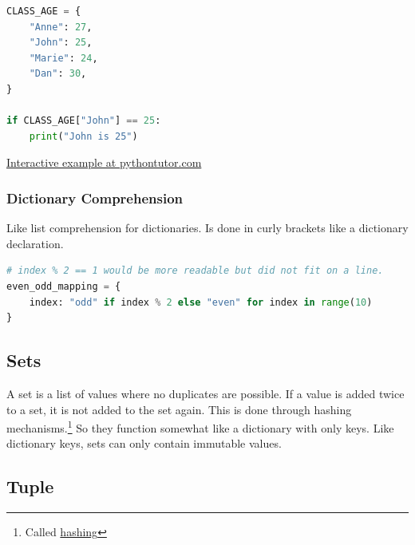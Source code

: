 \documentclass{article}
\begin{document}
\begin{lstlisting}[language=Python]
CLASS_AGE = {
    "Anne": 27,
    "John": 25,
    "Marie": 24,
    "Dan": 30,
}

if CLASS_AGE["John"] == 25:
    print("John is 25")
\end{lstlisting}

\href{http://pythontutor.com/visualize.html\#code=CLASS\_AGE\%20\%3D\%20\%7B\%0A\%20\%20\%20\%20\%22Anne\%22\%3A\%2027,\%0A\%20\%20\%20\%20\%22John\%22\%3A\%2025,\%0A\%20\%20\%20\%20\%22Marie\%22\%3A\%2024,\%0A\%20\%20\%20\%20\%22Dan\%22\%3A\%2030,\%0A\%7D\%0A\%0A\%23\%20This\%20is\%20True\%0Aif\%20CLASS\_AGE\%5B\%22John\%22\%5D\%20\%3D\%3D\%2025\%3A\%0A\%20\%20\%20\%20print\%28\%22John\%20is\%2025\%22\%29\%0A\%20\%20\%20\%20\%0Afor\%20key,\%20value\%20in\%20CLASS\_AGE.items\%28\%29\%3A\%0A\%20\%20\%20\%20print\%28f\%22\%7Bkey\%7D\%20is\%20\%7Bvalue\%7D\%20years\%20old.\%22\%29\&cumulative=false\&curInstr=15\&heapPrimitives=nevernest\&mode=display\&origin=opt-frontend.js\&py=3\&rawInputLstJSON=\%5B\%5D\&textReferences=false}
{Interactive example at pythontutor.com}

\subsubsection{Dictionary Comprehension}

Like list comprehension for dictionaries.
Is done in curly brackets like a dictionary declaration.

\begin{lstlisting}[language=Python]
# index % 2 == 1 would be more readable but did not fit on a line.
even_odd_mapping = {
    index: "odd" if index % 2 else "even" for index in range(10)
}
\end{lstlisting}

\subsection{Sets}

A set is a list of values where no duplicates are possible.
If a value is added twice to a set, it is not added to the set again.
This is done through hashing mechanisms.\footnote{
    Called \href{https://en.wikipedia.org/wiki/Hash_function}{hashing}
}
So they function somewhat like a dictionary with only keys.
Like dictionary keys, sets can only contain immutable values.

\subsection{Tuple}
\end{document}
